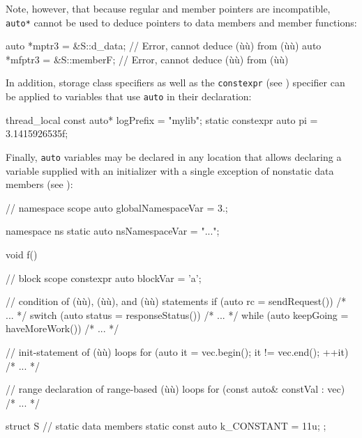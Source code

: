 \noindent Note, however, that because regular and member pointers are
incompatible, \lstinline!auto*! cannot be used to deduce pointers to data
members and member functions:

\begin{emcppslisting}[language=C++]
auto *mptr3  = &S::d_data;   // Error, cannot deduce (ù{}ù) from (ù{}ù)
auto *mfptr3 = &S::memberF;  // Error, cannot deduce (ù{}ù) from (ù{}ù)
\end{emcppslisting}
    
\noindent In addition, storage class specifiers as well as the \lstinline!constexpr!
(see ) specifier can be
applied to variables that use \lstinline!auto! in their declaration:

\begin{emcppslisting}[language=C++]
thread_local     const auto* logPrefix = "mylib";
static constexpr       auto  pi        = 3.1415926535f;
\end{emcppslisting}
    
\noindent Finally, \lstinline!auto! variables may be declared in any location that
allows declaring a variable supplied with an initializer with a single
exception of nonstatic data members (see ):

\begin{emcppslisting}[language=C++]
// namespace scope
auto globalNamespaceVar = 3.;

namespace ns
{
    static auto nsNamespaceVar = "...";
}

void f()
{
    // block scope
    constexpr auto blockVar = 'a';

    // condition of (ù{}ù), (ù{}ù), and (ù{}ù) statements
    if     (auto rc        = sendRequest())    { /* ... */ }
    switch (auto status    = responseStatus()) { /* ... */ }
    while  (auto keepGoing = haveMoreWork())   { /* ... */ }

    // init-statement of (ù{}ù) loops
    for (auto it = vec.begin(); it != vec.end(); ++it) { /* ... */ }

    // range declaration of range-based (ù{}ù) loops
    for (const auto& constVal : vec) { /* ... */ }
}

struct S
{
    // static data members
    static const auto k_CONSTANT = 11u;
};
\end{emcppslisting}
    

